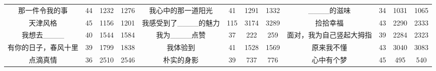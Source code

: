 \documentclass[11pt]{article}
\begin{document}
\begin{CJK}{UTF8}{gkai}
\begin{table}[htbp]
{\begin{tabular}{cccc|cccc|cccc}
      \textcolor[rgb]{ .502,  .502,  .502}{那一件令我的事} & \textcolor[rgb]{ .502,  .502,  .502}{44} & \textcolor[rgb]{ .502,  .502,  .502}{1232} & \textcolor[rgb]{ .502,  .502,  .502}{1276} & \textcolor[rgb]{ .502,  .502,  .502}{我心中的那一道阳光} & \textcolor[rgb]{ .502,  .502,  .502}{41} & \textcolor[rgb]{ .502,  .502,  .502}{1291} & \textcolor[rgb]{ .502,  .502,  .502}{1332} & \textcolor[rgb]{ .502,  .502,  .502}{\_\_\_\_的滋味} & \textcolor[rgb]{ .502,  .502,  .502}{34} & \textcolor[rgb]{ .502,  .502,  .502}{1031} & \textcolor[rgb]{ .502,  .502,  .502}{1065} \\
      \textcolor[rgb]{ .502,  .502,  .502}{天津风格} & \textcolor[rgb]{ .502,  .502,  .502}{45} & \textcolor[rgb]{ .502,  .502,  .502}{1156} & \textcolor[rgb]{ .502,  .502,  .502}{1201} & \textcolor[rgb]{ .502,  .502,  .502}{我感受到了\_\_\_\_的魅力} & \textcolor[rgb]{ .502,  .502,  .502}{115} & \textcolor[rgb]{ .502,  .502,  .502}{3174} & \textcolor[rgb]{ .502,  .502,  .502}{3289} & \textcolor[rgb]{ .502,  .502,  .502}{捡拾幸福} & \textcolor[rgb]{ .502,  .502,  .502}{43} & \textcolor[rgb]{ .502,  .502,  .502}{2290} & \textcolor[rgb]{ .502,  .502,  .502}{2333} \\
      \textcolor[rgb]{ .502,  .502,  .502}{我想去\_\_\_\_} & \textcolor[rgb]{ .502,  .502,  .502}{40} & \textcolor[rgb]{ .502,  .502,  .502}{1544} & \textcolor[rgb]{ .502,  .502,  .502}{1584} & 我为\_\_\_\_点赞 & 37    & 222   & 259   & \textcolor[rgb]{ .502,  .502,  .502}{面对，我为自己竖起大拇指} & \textcolor[rgb]{ .502,  .502,  .502}{39} & \textcolor[rgb]{ .502,  .502,  .502}{2284} & \textcolor[rgb]{ .502,  .502,  .502}{2323} \\
      \textcolor[rgb]{ .502,  .502,  .502}{有你的日子，春风十里} & \textcolor[rgb]{ .502,  .502,  .502}{39} & \textcolor[rgb]{ .502,  .502,  .502}{1799} & \textcolor[rgb]{ .502,  .502,  .502}{1838} & \textcolor[rgb]{ .502,  .502,  .502}{我体验到} & \textcolor[rgb]{ .502,  .502,  .502}{41} & \textcolor[rgb]{ .502,  .502,  .502}{1528} & \textcolor[rgb]{ .502,  .502,  .502}{1569} & \textcolor[rgb]{ .502,  .502,  .502}{原来我不懂} & \textcolor[rgb]{ .502,  .502,  .502}{43} & \textcolor[rgb]{ .502,  .502,  .502}{3040} & \textcolor[rgb]{ .502,  .502,  .502}{3083} \\
      \textcolor[rgb]{ .502,  .502,  .502}{点滴真情} & \textcolor[rgb]{ .502,  .502,  .502}{36} & \textcolor[rgb]{ .502,  .502,  .502}{2510} & \textcolor[rgb]{ .502,  .502,  .502}{2546} & 朴实的身影 & 39    & 737   & 776   & 心中有个梦 & 45    & 495   & 540 \\

\end{tabular}}
\end{table}
\end{CJK}
\end{document}
